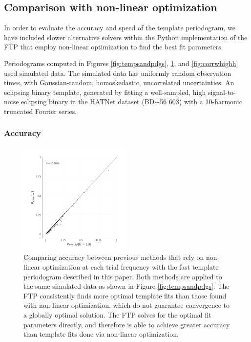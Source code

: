 \documentclass{aastex62}
\begin{document}
\subsection{Comparison with non-linear optimization}

In order to evaluate the accuracy and speed of the template periodogram,
we have included slower alternative solvers within the Python implementation
of the FTP that employ non-linear optimization to find the best fit parameters.

Periodograms computed in Figures \ref{fig:tempsandpdgs}, \ref{fig:corrwgats},
and \ref{fig:corrwhighh} used simulated data. The simulated data has uniformly
random observation times, with Gaussian-random, homoskedastic, uncorrelated
uncertainties. An eclipsing binary template, generated by fitting a well-sampled,
high signal-to-noise eclipsing binary in the HATNet dataset (BD+56 603)
with a 10-harmonic truncated Fourier series.

\subsubsection{Accuracy}

\begin{figure}
    \centering
    \includegraphics[width=0.5\textwidth]{correlation_with_nonlinopt.pdf}
    \caption{\label{fig:corrwgats} Comparing accuracy between previous methods that rely
            on non-linear optimization at each trial frequency with the fast template periodogram
            described in this paper. Both methods are applied to the same simulated data as shown
            in Figure \ref{fig:tempsandpdgs}.
            The FTP consistently finds more optimal template fits than
            those found with non-linear optimization, which do not guarantee convergence to
            a globally optimal solution. The FTP solves for the optimal
            fit parameters directly, and therefore is able to achieve greater accuracy than template
            fits done via non-linear optimization.}
\end{figure}
\end{document}
